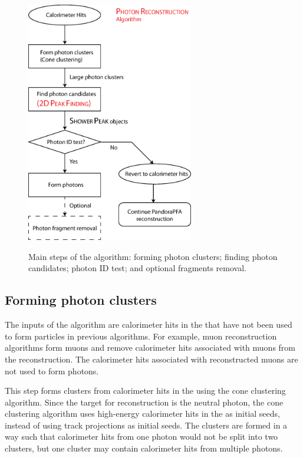 \begin{figure}[tbph]
\centering
{\includegraphics[width=0.65\textwidth]{photon/photonRecoFlow2}}
\caption[A flow diagram of the \PhotonReconstruction algorithm.]
{Main steps of the \PhotonReconstruction algorithm: forming photon clusters; finding photon candidates; photon ID test; and optional fragments removal.}
\label{fig:photonPhotonRecoFlow}
\end{figure}


\subsection{Forming photon clusters}

The inputs of the \PhotonReconstruction algorithm are calorimeter hits in the \ECAL that have not been used to form particles in previous algorithms. For example, muon reconstruction algorithms form muons and remove calorimeter hits associated with muons from the reconstruction. The  calorimeter hits associated with reconstructed muons are not used to form photons.

This step forms clusters from calorimeter hits in the \ECAL using the cone clustering algorithm. Since the target for reconstruction is the neutral photon, the cone clustering algorithm uses high-energy calorimeter hits in the \ECAL as initial seeds, instead of using track projections as initial seeds.  The clusters are formed in a way such that calorimeter hits from one photon would not be split into two clusters, but one cluster may contain calorimeter hits from  multiple photons.



